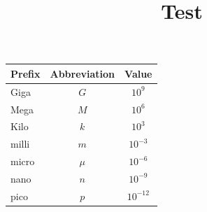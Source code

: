 \documentclass[10pt,landscape,twocolumn]{article}
\title{Test}
\begin{document}


	\begin{tabular}{|l|c|c|}
		\hline
		Prefix & Abbreviation & Value \\
		\hline \hline
		Giga & $G$ & $10^9$ \\
		Mega & $M$ & $10^6$ \\
		Kilo & $k$ & $10^3$ \\
		\hline
		milli & $m$ & $10^{-3}$ \\
		micro & $\mu$ & $10^{-6}$ \\
		nano & $n$ & $10^{-9}$ \\
		pico & $p$ & $10^{-12}$ \\
		\hline
	\end{tabular}


\begin{figure}[b]
	\centering
\end{figure}
\end{document}

